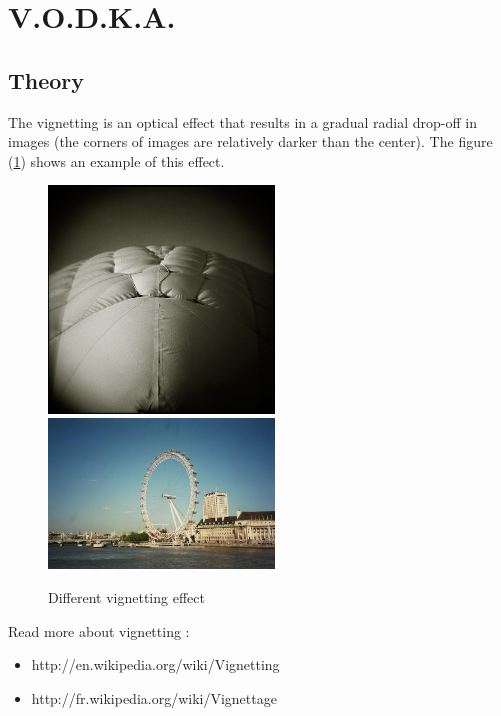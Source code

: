 
\section{V.O.D.K.A.}
\label{V.O.D.K.A.}

\subsection{Theory}

The vignetting is an optical effect that results in a gradual radial drop-off in images (the corners of images are relatively darker than the center). The figure (\ref{image_vignette}) shows an example of this effect.

\begin{figure}[htb]
\centering
\includegraphics[width=6cm]{FIGS/Arsenic/595px-Swanson_tennis_center.jpg}
\includegraphics[width=6cm]{FIGS/Arsenic/London_eye_501588_fh000038.jpg}
\caption{
Different vignetting effect
}
\label{image_vignette}
\end{figure}

Read more about vignetting :
\begin{itemize}
   \item http://en.wikipedia.org/wiki/Vignetting
   \item http://fr.wikipedia.org/wiki/Vignettage
\end{itemize}


